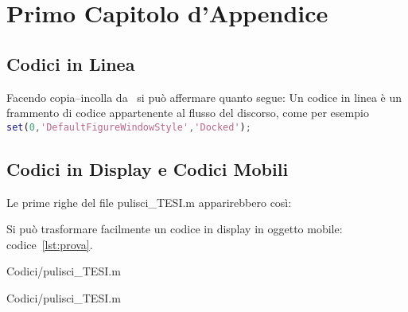 %
%
\chapter{Primo Capitolo d'Appendice}
%
\label{cap:appendice1}
%
%
\lipsum[1]
%
\section{Codici in Linea}
Facendo copia--incolla da~ si può affermare quanto segue: \omissis Un codice in linea è un frammento di codice appartenente al flusso del discorso, come per esempio \lstinline[language=Matlab]!set(0,'DefaultFigureWindowStyle','Docked');!\omissis
%
\section{Codici in Display e Codici Mobili}
%
\omissis Le prime righe del file pulisci\_TESI.m apparirebbero così:
%

%
Si può trasformare facilmente un codice in display in oggetto mobile: codice~\vref{lst:prova}.
%
\begin{lstinputlisting}[float=tb,
		lastline=8,
		language=Matlab,
		caption={prova},
		label=lst:prova]
		{Codici/pulisci_TESI.m}
\end{lstinputlisting}
%
\lipsum[1]
%
\begin{lstinputlisting}[%
		language=Matlab,
		caption={prova codice intero},
		label=lst:provaIntero]
		{Codici/pulisci_TESI.m}
\end{lstinputlisting}
%
\lipsum[1]
%
